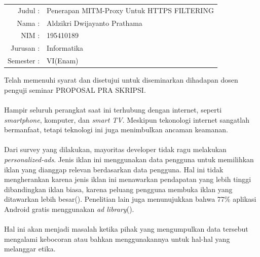 \documentclass[a4paper,12pt]{article}
\newcommand{\bagian}[1]{\flushleft{\section{#1}}}
\begin{document}
\vspace{5ex}
\begin{tabular}{rl}
  Judul    :& Penerapan MITM-Proxy Untuk HTTPS FILTERING\\[5ex]
  Nama     :& Aldzikri Dwijayanto Prathama\\[5ex]
  NIM      :& 195410189\\[5ex]
  Jurusan  :& Informatika\\[5ex]
  Semester :& VI(Enam)\\[5ex]
\end{tabular}
\begin{center}
  Telah memenuhi syarat dan disetujui untuk diseminarkan
  dihadapan dosen penguji seminar PROPOSAL PRA SKRIPSI.
\end{center}

\newpage
%
\bagian{Latar Belakang}
  \paragraph*{} Hampir seluruh perangkat saat ini terhubung
  dengan internet, seperti \textit{smartphone}, komputer,
  dan \textit{smart TV}. Meskipun tekonologi internet
  sangatlah bermanfaat, tetapi teknologi ini juga
  menimbulkan ancaman keamanan.

  \paragraph*{} Dari survey yang dilakukan, mayoritas
  developer tidak ragu melakukan \textit{personalized-ads}.
  Jenis iklan ini menggunakan data pengguna untuk memilihkan
  iklan yang dianggap relevan berdasarkan data pengguna. Hal
  ini tidak mengherankan karena jenis iklan ini menawarkan
  pendapatan yang lebih tinggi dibandingkan iklan biasa,
  karena peluang pengguna membuka iklan yang ditawarkan
  lebih besar(\cite{tahaei2021}). Penelitian lain juga
  menunujukkan bahwa 77\% aplikasi Android gratis
  menggunakan \textit{ad library}(\cite{he2018, jin2021}).

  \paragraph*{} Hal ini akan menjadi masalah ketika pihak
  yang mengumpulkan data tersebut mengalami kebocoran atau
  bahkan menggunakannya untuk hal-hal yang melanggar etika.
\end{document}
